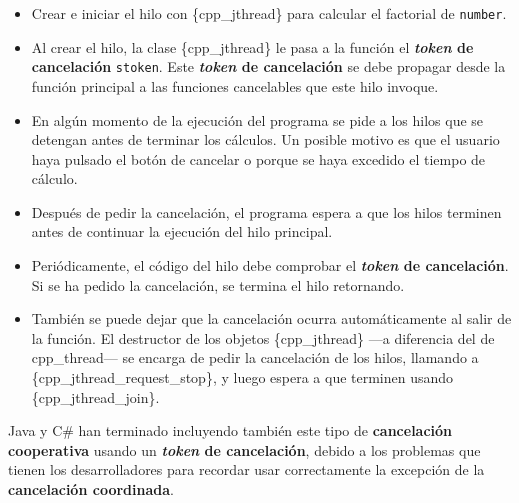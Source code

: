 \begin{Shaded}
\begin{Highlighting}[]

\OperatorTok{();} 
\OperatorTok{();} 

\OperatorTok{();} 
\OperatorTok{();} 

    
\OperatorTok{\}}
\end{Highlighting}
\end{Shaded}

\begin{itemize}
\item
  Crear e iniciar el hilo con \{cpp\_jthread\} para calcular el
  factorial de \texttt{number}.
\item
  Al crear el hilo, la clase \{cpp\_jthread\} le pasa a la función el
  \textbf{\emph{token} de cancelación} \texttt{stoken}. Este
  \textbf{\emph{token} de cancelación} se debe propagar desde la función
  principal a las funciones cancelables que este hilo invoque.
\item
  En algún momento de la ejecución del programa se pide a los hilos que
  se detengan antes de terminar los cálculos. Un posible motivo es que
  el usuario haya pulsado el botón de cancelar o porque se haya excedido
  el tiempo de cálculo.
\item
  Después de pedir la cancelación, el programa espera a que los hilos
  terminen antes de continuar la ejecución del hilo principal.
\item
  Periódicamente, el código del hilo debe comprobar el
  \textbf{\emph{token} de cancelación}. Si se ha pedido la cancelación,
  se termina el hilo retornando.
\item
  También se puede dejar que la cancelación ocurra automáticamente al
  salir de la función. El destructor de los objetos \{cpp\_jthread\}
  ---a diferencia del de cpp\_thread--- se encarga de pedir la
  cancelación de los hilos, llamando a \{cpp\_jthread\_request\_stop\},
  y luego espera a que terminen usando \{cpp\_jthread\_join\}.
\end{itemize}

Java y C\# han terminado incluyendo también este tipo de
\textbf{cancelación cooperativa} usando un \textbf{\emph{token} de
cancelación}, debido a los problemas que tienen los desarrolladores para
recordar usar correctamente la excepción de la \textbf{cancelación
coordinada}.

